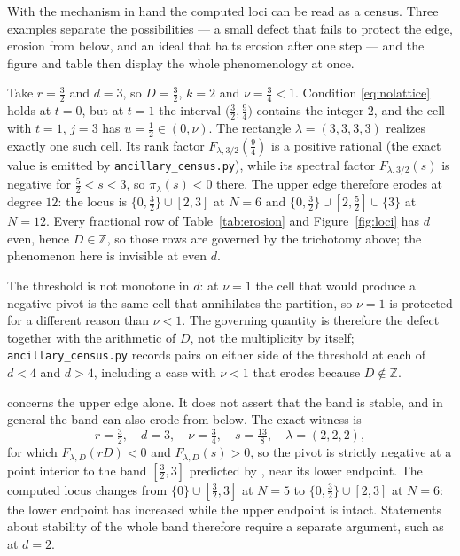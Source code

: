 \documentclass[11pt,letterpaper]{article}
\newcommand{\Zint}{\mathbb{Z}}
\begin{document}
With the mechanism in hand the computed loci can be read as a census. Three
examples separate the possibilities --- a small defect that fails to protect the
edge, erosion from below, and an ideal that halts erosion after one step --- and
the figure and table then display the whole phenomenology at once.

\begin{remark}
\label{rem:latticewitness}
Take $r=\tfrac32$ and $d=3$, so $D=\tfrac32$, $k=2$ and $\nu=\tfrac34<1$.
Condition \eqref{eq:nolattice} holds at $t=0$, but at $t=1$ the interval
$\bigl(\tfrac32,\tfrac94\bigr)$ contains the integer $2$, and the cell with
$t=1$, $j=3$ has $u=\tfrac12\in(0,\nu)$. The rectangle
$\lambda=(3,3,3,3)$ realizes exactly one such cell. Its rank factor
$F_{\lambda,3/2}(\tfrac94)$ is a positive rational (the exact value is emitted by
\texttt{ancillary\_census.py}), while its spectral factor $F_{\lambda,3/2}(s)$ is negative for
$\tfrac52<s<3$, so $\pi_\lambda(s)<0$ there. The upper edge therefore erodes at
degree $12$: the locus is $\{0,\tfrac32\}\cup[2,3]$ at $N=6$ and
$\{0,\tfrac32\}\cup[2,\tfrac52]\cup\{3\}$ at $N=12$. Every fractional row of
Table~\ref{tab:erosion} and Figure~\ref{fig:loci} has $d$ even, hence
$D\in\Zint$, so those rows are governed by the trichotomy above; the phenomenon
here is invisible at even $d$.
\end{remark}

The threshold is not monotone in $d$: at $\nu=1$ the cell
that would produce a negative pivot is the same cell that annihilates the
partition, so $\nu=1$ is protected for a different reason than $\nu<1$. The
governing quantity is therefore the defect together with the arithmetic of $D$,
not the multiplicity by itself; \texttt{ancillary\_census.py} records pairs on
either side of the threshold at each of $d<4$ and $d>4$, including a case with
$\nu<1$ that erodes because $D\notin\Zint$.

 concerns the upper edge alone. It does not assert that the
band is stable, and in general the band can also erode from below. The exact
witness is
\begin{equation}
  r=\tfrac32,\quad d=3,\quad \nu=\tfrac34,\quad s=\tfrac{13}{8},
  \quad \lambda=(2,2,2),
  \label{eq:belowwitness}
\end{equation}
for which $F_{\lambda,D}(rD)<0$ and $F_{\lambda,D}(s)>0$, so the pivot is
strictly negative at a point interior to the band $[\tfrac32,3]$ predicted by
, near its lower endpoint. The computed locus changes from
$\{0\}\cup[\tfrac32,3]$ at $N=5$ to $\{0,\tfrac32\}\cup[2,3]$ at $N=6$: the lower
endpoint has increased while the upper endpoint is intact. Statements about
stability of the whole band therefore require a separate argument, such as
 at $d=2$.
\end{document}
